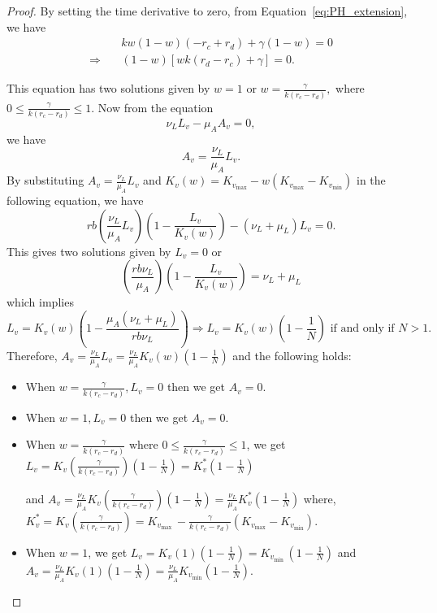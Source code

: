 \documentclass{article}
\theoremstyle{remark}
\theoremstyle{custom} %
\begin{document}
\begin{proof}

By setting the time derivative to zero, from Equation~\eqref{eq:PH_extension}, we have  $$
\begin{aligned}
& kw(1-w)(-r_c + r_d)+\gamma(1-w)=0 \\
\Rightarrow \quad & (1-w)[wk(r_d - r_c)+\gamma]=0.
\end{aligned}
$$

This equation has two solutions given by $w=1$ or $w=\frac{\gamma}{k(r_c - r_d)},$  where $0 \leq \frac{\gamma}{k\left(r_c-r_d\right)} \leq 1$. Now from the equation \[\nu_L L_v - \mu_A A_v = 0,
\] we have
\[
A_v = \frac{\nu_L}{\mu_A} L_v.
\]
By substituting \(A_v = \frac{\nu_L}{\mu_A} L_v\) and \(K_v(w) = K_{v_{\max}} - w (K_{v_{\max}} - K_{v_{\min}})\) in the following equation, we have
\[
r b \left(\frac{\nu_L}{\mu_A} L_v \right) \left(1 - \frac{L_v}{K_v(w)}\right) - (\nu_L + \mu_L) L_v = 0.
\]
This gives two solutions given by $L_v = 0$ or
\[
\left(\frac{r b \nu_L}{\mu_A}\right) \left(1 - \frac{L_v}{K_v(w)}\right) = \nu_L + \mu_L
\]
which implies
$$
L_v  = K_v(w)\left(1-\frac{\mu_A\left(\nu_L+\mu_L\right)}{r b \nu_L}\right) 
\Rightarrow L_v  =K_v(w)\left(1-\frac{1}{N}\right) \text { if and only if } N>1.
$$
Therefore, $A_v=\frac{\nu_L}{\mu_A} L_v=\frac{\nu_L}{\mu_A} K_v(w)\left(1-\frac{1}{N}\right)$ and the following holds:

\begin{itemize}

\item When $w=\frac{\gamma}{k(r_c-r_d)}, L_v=0$ then we get $A_v=0.$

\item When $w=1, L_v=0$ then we get $A_v=0.$

\item When $w=\frac{\gamma}{k(r_c-r_d)}$ where $0 \leq \frac{\gamma}{k\left(r_c-r_d\right)} \leq 1$, we get $L_v=K_v\left(\frac{\gamma}{k(r_c-r_d)}\right)\left(1-\frac{1}{N}\right)=K_v^*\left(1-\frac{1}{N}\right)$ 

and $A_v=\frac{\nu_L}{\mu_A} K_v\left(\frac{\gamma}{k(r_c-r_d)}\right)\left(1-\frac{1}{N}\right)=\frac{\nu_L}{\mu_A} K_v^*\left(1-\frac{1}{N}\right)$
where, $K_v^*=K_v\left(\frac{\gamma}{k(r_c-r_d)}\right)=K_{v_{\text {max }}}-\frac{\gamma}{k(r_c-r_d)}\left(K_{v_{\text {max}}}-K_{v_{\text {min}}}\right)$.


\item When $w=1$, we get $L_v=K_v(1)\left(1-\frac{1}{N}\right)=K_{v_{\text {min }}}\left(1-\frac{1}{N}\right)$ and
$
A_v=\frac{\nu_L}{\mu_A} K_v(1)\left(1-\frac{1}{N}\right)=\frac{\nu_L}{\mu_A} K_{v_{\min }}\left(1-\frac{1}{N}\right).
$



\end{itemize}
\end{proof}
\end{document}
